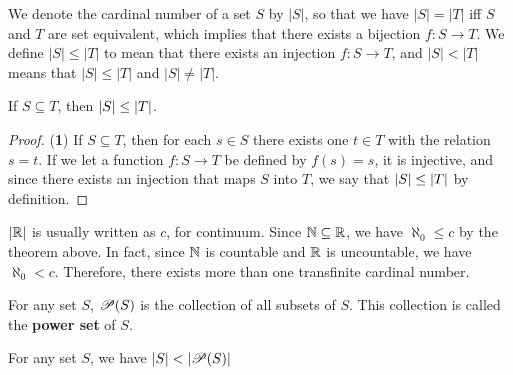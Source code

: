 \begin{definition}
	We denote the cardinal number of a set $S$ by $|S|$, so that we have $|S|=|T|$ iff $S$ and $T$ are set equivalent, which implies that there exists a bijection $f:S\rightarrow T$. We define $|S|\leq|T|$ to mean that there exists an injection $f:S\rightarrow T$, and $|S|<|T|$ means that $|S|\leq|T|$ and $|S|\neq|T|$.
\end{definition}

\begin{theorem}
	If $S\subseteq T$, then $\abs{S}\leq \abs{T}$.
\end{theorem}

\begin{proof}(\textbf{1})
	If $S\subseteq T$, then for each $s\in S$ there exists one $t\in T$ with the relation $s=t$. If we let a function $f:S\rightarrow T$ be defined by $f(s)=s$, it is injective, and since there exists an injection that maps $S$ into $T$, we say that $\abs{S}\leq \abs{T}$ by definition.
\end{proof}

\begin{remark}
	$\abs{\mathbb{R}}$ is usually written as $c$, for continuum. Since $\mathbb{N}\subseteq\mathbb{R}$, we have $\aleph_0\leq c$ by the theorem above. In fact, since $\mathbb{N}$ is countable and $\mathbb{R}$ is uncountable, we have $\aleph_0<c$. Therefore, there exists more than one transfinite cardinal number.
\end{remark}

\begin{definition}
	For any set $S$, $\mathscr{P}(S)$ is the collection of all subsets of $S$. This collection is called the \textbf{power set} of $S$.
\end{definition}

\begin{theorem}
	For any set $S$, we have $\abs{S}<\abs{\mathscr P(S)}$
\end{theorem}

